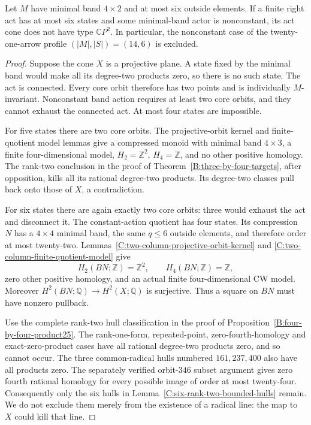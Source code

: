 \begin{theorem}
\label{C:four-row-nonconstant-six-states}
Let $M$ have minimal band $4\times2$ and at most six outside elements.
If a finite right act has at most six states and some minimal-band
actor is nonconstant, its act cone does not have type
$\mathbb CP^2$.
In particular, the nonconstant case of the twenty-one-arrow profile
$(|M|,|S|)=(14,6)$ is excluded.
\end{theorem}
\begin{proof}
Suppose the cone $X$ is a projective plane.  A state fixed by the
minimal band would make all its degree-two products zero, so there
is no such state.  The act is connected.  Every core orbit therefore
has two points and is individually $M$-invariant.  Nonconstant band
action requires at least two core orbits, and they cannot exhaust
the connected act.  At most four states are impossible.

For five states there are two core orbits.  The projective-orbit
kernel and finite-quotient model lemmas give a compressed monoid
with minimal band $4\times3$, a finite four-dimensional model,
$H_2=\mathbb Z^2$, $H_4=\mathbb Z$, and no other positive homology.
The rank-two conclusion in the proof of
Theorem~\ref{B:three-by-four-targets}, after opposition, kills all
its rational degree-two products.  Its degree-two classes pull back
onto those of $X$, a contradiction.

For six states there are again exactly two core orbits: three would
exhaust the act and disconnect it.  The constant-action quotient
has four states.  Its compression $N$ has a $4\times4$ minimal band,
the same $q\leq6$ outside elements, and therefore order at most
twenty-two.  Lemmas~\ref{C:two-column-projective-orbit-kernel} and
\ref{C:two-column-finite-quotient-model} give
\[
 H_2(BN;\mathbb Z)=\mathbb Z^2,\qquad
 H_4(BN;\mathbb Z)=\mathbb Z,
\]
zero other positive homology, and an actual finite four-dimensional
CW model.  Moreover $H^2(BN;\mathbb Q)\to H^2(X;\mathbb Q)$ is
surjective.  Thus a square on $BN$ must have nonzero pullback.

Use the complete rank-two hull classification in the proof of
Proposition~\ref{B:four-by-four-product25}.  The rank-one-form,
repeated-point, zero-fourth-homology and exact-zero-product cases
have all rational degree-two products zero, and so cannot occur.
The three common-radical hulls numbered $161,237,400$ also have all
products zero.  The separately verified orbit-$346$ subset argument
gives zero fourth rational homology for every possible image of
order at most twenty-four.  Consequently only the six hulls in
Lemma~\ref{C:six-rank-two-bounded-hulls} remain.  We do not exclude
them merely from the existence of a radical line: the map to $X$
could kill that line.


\end{proof}
